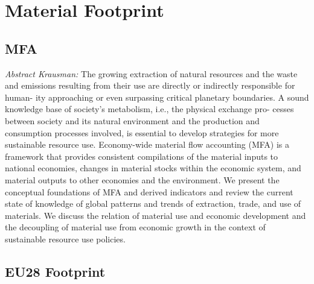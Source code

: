 \documentclass[
]{book}
\begin{document}
\hypertarget{material-footprint}{%
\section{Material Footprint}\label{material-footprint}}

\hypertarget{mfa}{%
\subsection{MFA}\label{mfa}}

\emph{Abstract Krausman:}
The growing extraction of natural resources and the waste and emissions
resulting from their use are directly or indirectly responsible for human-
ity approaching or even surpassing critical planetary boundaries. A sound
knowledge base of society's metabolism, i.e., the physical exchange pro-
cesses between society and its natural environment and the production and
consumption processes involved, is essential to develop strategies for more
sustainable resource use. Economy-wide material flow accounting (MFA) is
a framework that provides consistent compilations of the material inputs to
national economies, changes in material stocks within the economic system,
and material outputs to other economies and the environment. We present
the conceptual foundations of MFA and derived indicators and review the
current state of knowledge of global patterns and trends of extraction, trade,
and use of materials. We discuss the relation of material use and economic
development and the decoupling of material use from economic growth in
the context of sustainable resource use policies.

\hypertarget{eu28-footprint}{%
\subsection{EU28 Footprint}\label{eu28-footprint}}
\end{document}
